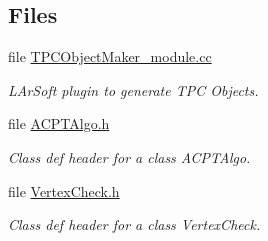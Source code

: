 \subsection*{\-Files}
\begin{DoxyCompactItemize}
\item 
file \hyperlink{TPCObjectMaker__module_8cc}{\-T\-P\-C\-Object\-Maker\-\_\-module.\-cc}
\begin{DoxyCompactList}\small\item\em \-L\-Ar\-Soft plugin to generate \-T\-P\-C \-Objects. \end{DoxyCompactList}\item 
file \hyperlink{ACPTAlgo_8h}{\-A\-C\-P\-T\-Algo.\-h}
\begin{DoxyCompactList}\small\item\em \-Class def header for a class \-A\-C\-P\-T\-Algo. \end{DoxyCompactList}\item 
file \hyperlink{VertexCheck_8h}{\-Vertex\-Check.\-h}
\begin{DoxyCompactList}\small\item\em \-Class def header for a class \-Vertex\-Check. \end{DoxyCompactList}\end{DoxyCompactItemize}
